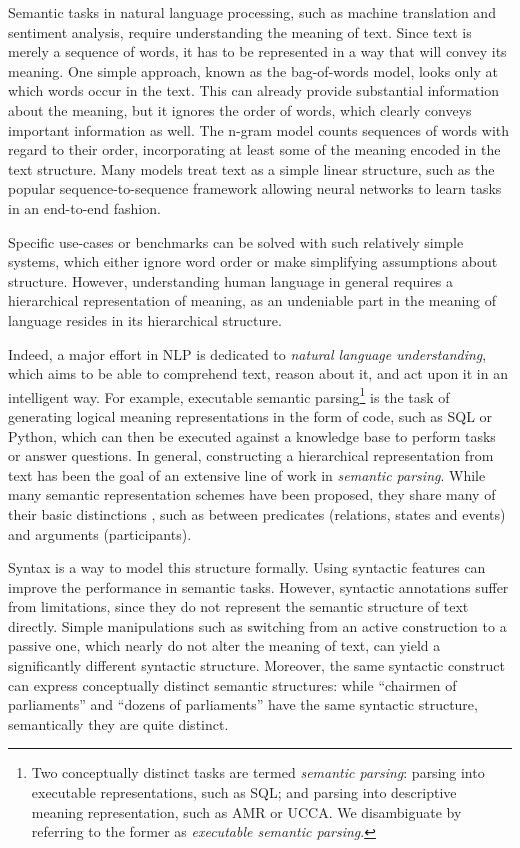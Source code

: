 \documentclass[12pt,a4paper,table]{report}
\begin{document}
Semantic tasks in natural language processing, such as machine translation and
sentiment analysis, require understanding the meaning of text. Since text is
merely a sequence of words, it has to be represented in a way that will convey
its meaning. One simple approach, known as the bag-of-words model, looks only
at which words occur in the text.
This can already provide
substantial information about the meaning, but it ignores the order of words,
which clearly conveys important information as well. The n-gram model counts
sequences of words with regard to their order, incorporating at least some of
the meaning encoded in the text structure.
Many models treat text as a simple linear structure,
such as the popular sequence-to-sequence framework allowing neural networks
to learn tasks in an end-to-end fashion.

Specific use-cases or benchmarks can be solved with such relatively simple
systems, which either ignore word order or make simplifying assumptions about structure.
However, understanding human language in general
requires a hierarchical representation of meaning,
as an undeniable part in the
meaning of language resides in its hierarchical structure.

Indeed, a major effort in NLP is dedicated to \textit{natural language understanding},
which aims to be able to comprehend text, reason about it, and act upon it
in an intelligent way.
For example, executable semantic parsing\footnote{Two conceptually distinct
tasks are termed \textit{semantic parsing}: parsing into
executable representations, such as SQL; and parsing into descriptive meaning
representation, such as AMR or UCCA.
We disambiguate by referring to the former as \textit{executable semantic parsing}.}
is the task of generating logical meaning representations in the form of code, such as
SQL or Python, which can then be executed against a knowledge base to perform
tasks or answer questions.
In general, constructing a hierarchical representation from text has been the
goal of an extensive line of work in \textit{semantic parsing}.
While many semantic representation schemes have been proposed,
they share many of their basic distinctions \citep{abend2017state},
such as between predicates
(relations, states and events) and arguments (participants).

Syntax is a way to
model this structure formally. Using syntactic features can improve the
performance in semantic tasks.
However, syntactic annotations suffer from limitations, since they do not
represent the semantic structure of text directly. Simple manipulations such as
switching from an active construction to a passive one, which nearly do not
alter the meaning of text, can yield a significantly different syntactic
structure. Moreover, the same syntactic construct can express conceptually
distinct semantic structures: while ``chairmen of parliaments'' and
``dozens of parliaments'' have the same syntactic structure, semantically
they are quite distinct.
\end{document}
